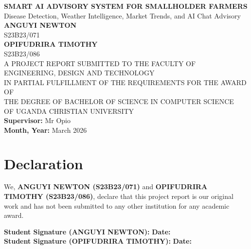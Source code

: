 \documentclass[12pt,a4paper]{report}
\begin{document}
\begin{titlepage}
    \centering
    {\Large \textbf{SMART AI ADVISORY SYSTEM FOR SMALLHOLDER FARMERS}}\\[1.2cm]
    {\large Disease Detection, Weather Intelligence, Market Trends, and AI Chat Advisory}\\[2cm]

    {\large \textbf{ANGUYI NEWTON}}\\
    {\large S23B23/071}\\[0.35cm]
    {\large \textbf{OPIFUDRIRA TIMOTHY}}\\
    {\large S23B23/086}\\[1.8cm]

    {\large A PROJECT REPORT SUBMITTED TO THE FACULTY OF ENGINEERING, DESIGN AND TECHNOLOGY}\\
    {\large IN PARTIAL FULFILLMENT OF THE REQUIREMENTS FOR THE AWARD OF}\\
    {\large THE DEGREE OF BACHELOR OF SCIENCE IN COMPUTER SCIENCE}\\
    {\large OF UGANDA CHRISTIAN UNIVERSITY}\\[1.8cm]

    {\large \textbf{Supervisor:} Mr Opio}\\[0.4cm]
    {\large \textbf{Month, Year:} March 2026}\\
\end{titlepage}


\chapter*{Declaration}
We, \textbf{ANGUYI NEWTON (S23B23/071)} and \textbf{OPIFUDRIRA TIMOTHY (S23B23/086)}, declare that this project report is our original work and has not been submitted to any other institution for any academic award.

\vspace{1.2cm}
\noindent\textbf{Student Signature (ANGUYI NEWTON):} \hrulefill \hspace{1cm} \textbf{Date:} \hrulefill\\[0.6cm]
\textbf{Student Signature (OPIFUDRIRA TIMOTHY):} \hrulefill \hspace{1cm} \textbf{Date:} \hrulefill
\end{document}
